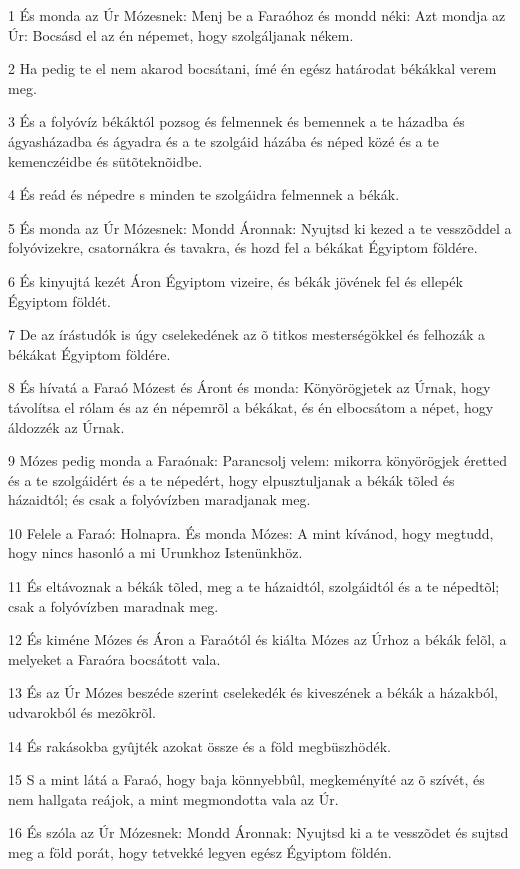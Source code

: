 \par 1 És monda az Úr Mózesnek: Menj be a Faraóhoz és mondd néki: Azt mondja az Úr: Bocsásd el az én népemet, hogy szolgáljanak nékem.
\par 2 Ha pedig te el nem akarod bocsátani, ímé én egész határodat békákkal verem meg.
\par 3 És a folyóvíz békáktól pozsog és felmennek és bemennek a te házadba és ágyasházadba és ágyadra és a te szolgáid házába és néped közé és a te kemenczéidbe és sütõteknõidbe.
\par 4 És reád és népedre s minden te szolgáidra felmennek a békák.
\par 5 És monda az Úr Mózesnek: Mondd Áronnak: Nyujtsd ki kezed a te vesszõddel a folyóvizekre, csatornákra és tavakra, és hozd fel a békákat Égyiptom földére.
\par 6 És kinyujtá kezét Áron Égyiptom vizeire, és békák jövének fel és ellepék Égyiptom földét.
\par 7 De az írástudók is úgy cselekedének az õ titkos mesterségökkel és felhozák a békákat Égyiptom földére.
\par 8 És hívatá a Faraó Mózest és Áront és monda: Könyörögjetek az Úrnak, hogy távolítsa el rólam és az én népemrõl a békákat, és én elbocsátom a népet, hogy áldozzék az Úrnak.
\par 9 Mózes pedig monda a Faraónak: Parancsolj velem: mikorra könyörögjek éretted és a te szolgáidért és a te népedért, hogy elpusztuljanak a békák tõled és házaidtól; és csak a folyóvízben maradjanak meg.
\par 10 Felele a Faraó: Holnapra. És monda Mózes: A mint kívánod, hogy megtudd, hogy nincs hasonló a mi Urunkhoz Istenünkhöz.
\par 11 És eltávoznak a békák tõled, meg a te házaidtól, szolgáidtól és a te népedtõl; csak a folyóvízben maradnak meg.
\par 12 És kiméne Mózes és Áron a Faraótól és kiálta Mózes az Úrhoz a békák felõl, a melyeket a Faraóra bocsátott vala.
\par 13 És az Úr Mózes beszéde szerint cselekedék és kiveszének a békák a házakból, udvarokból és mezõkrõl.
\par 14 És rakásokba gyûjték azokat össze és a föld megbüszhödék.
\par 15 S a mint látá a Faraó, hogy baja könnyebbûl, megkeményíté az õ szívét, és nem hallgata reájok, a mint megmondotta vala az Úr.
\par 16 És szóla az Úr Mózesnek: Mondd Áronnak: Nyujtsd ki a te vesszõdet és sujtsd meg a föld porát, hogy tetvekké legyen egész Égyiptom földén.
